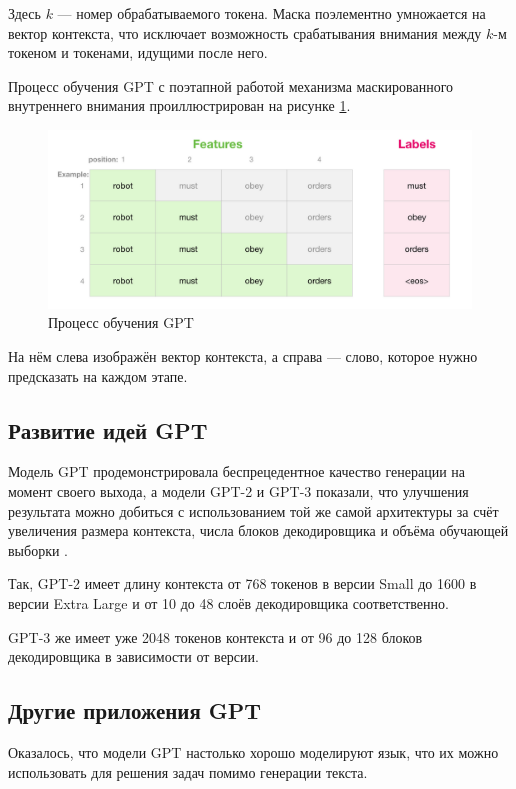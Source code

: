 Здесь $k$ --- номер обрабатываемого токена. Маска поэлементно умножается на вектор контекста, что исключает возможность срабатывания внимания между $k$-м токеном и токенами, идущими после него.

Процесс обучения GPT с поэтапной работой механизма маскированного внутреннего внимания проиллюстрирован на рисунке \ref*{fig:gpt_training}.

\begin{figure}[H]
    \centering
    \includegraphics[width=\textwidth]{../inc/images/gpt_training.png}
    \caption{Процесс обучения GPT}
    \label{fig:gpt_training}
\end{figure}

На нём слева изображён вектор контекста, а справа --- слово, которое нужно предсказать на каждом этапе.

\subsection{Развитие идей GPT}

Модель GPT продемонстрировала беспрецедентное качество генерации на момент своего выхода, а модели GPT-2 и GPT-3 показали, что улучшения результата можно добиться с использованием той же самой архитектуры за счёт увеличения размера контекста, числа блоков декодировщика и объёма обучающей выборки \cite{art:gpt3}.

Так, GPT-2 имеет длину контекста от 768 токенов в версии Small до 1600 в версии Extra Large и от 10 до 48 слоёв декодировщика соответственно.

GPT-3 же имеет уже 2048 токенов контекста и от 96 до 128 блоков декодировщика в зависимости от версии.

\subsection{Другие приложения GPT}

Оказалось, что модели GPT настолько хорошо моделируют язык, что их можно использовать для решения задач помимо генерации текста.

